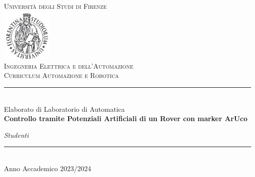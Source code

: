 \begin{titlepage}
    \begin{center}
        \textsc{\Large Universit\`a degli Studi di Firenze}\medskip
	    \\ [1.0cm]
		\includegraphics[width=25mm]{img/stemma}\\[.5cm]
		 \textsc{ Ingegneria Elettrica e dell'Automazione \\ Curriculum Automazione e Robotica}\medskip\\
		 \rule{50mm}{0.01mm}\medskip\\
		Elaborato di Laboratorio di Automatica \medskip\\
    \LARGE \textbf{ Controllo tramite Potenziali Artificiali di un Rover con marker ArUco } 
    \normalsize  \vspace*{5\baselineskip}
    \medskip\\
       
         \end{center}
          \makeatletter
    \begin{minipage}[t]{65mm}
   \raggedright
   {\it Studenti}\newline
    \@author
   \end{minipage}%
		\makeatother
		
   \vfill
  \begin{center}
    \rule{40mm}{0.01mm}\\
    {Anno Accademico 2023/2024}
  \end{center}
\end{titlepage} 
